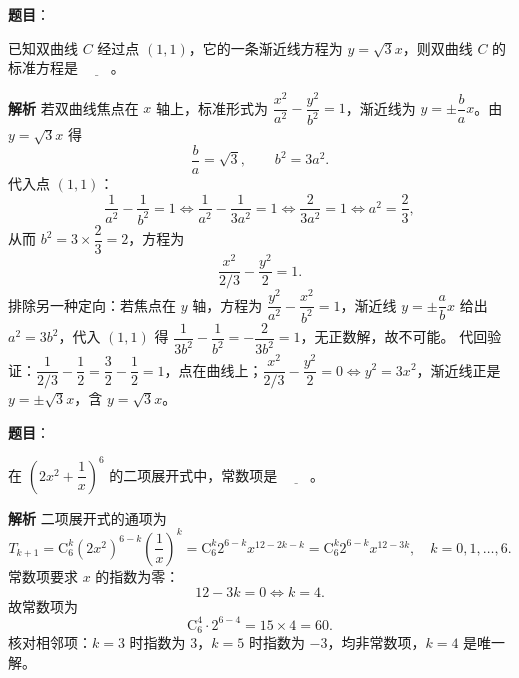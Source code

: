 \begin{answer}

\textbf{题目}：

已知双曲线 $C$ 经过点 $(1,1)$，它的一条渐近线方程为 $y=\sqrt3x$，则双曲线 $C$ 的标准方程是 $\underline{\qquad}$。

\textbf{解析}
若双曲线焦点在 $x$ 轴上，标准形式为 $\dfrac{x^2}{a^2}-\dfrac{y^2}{b^2}=1$，渐近线为 $y=\pm\dfrac ba x$。由 $y=\sqrt3x$ 得
\nopagebreak[4]
\[\frac{b}{a}=\sqrt3,\qquad b^2=3a^2.\]
代入点 $(1,1)$：
\nopagebreak[4]
\[\frac1{a^2}-\frac1{b^2}=1\iff\frac1{a^2}-\frac1{3a^2}=1\iff\frac{2}{3a^2}=1\iff a^2=\frac23,\]
从而 $b^2=3\times\dfrac23=2$，方程为
\nopagebreak[4]
\[\frac{x^2}{2/3}-\frac{y^2}{2}=1.\]
排除另一种定向：若焦点在 $y$ 轴，方程为 $\dfrac{y^2}{a^2}-\dfrac{x^2}{b^2}=1$，渐近线 $y=\pm\dfrac ab x$ 给出 $a^2=3b^2$，代入 $(1,1)$ 得 $\dfrac1{3b^2}-\dfrac1{b^2}=-\dfrac{2}{3b^2}=1$，无正数解，故不可能。
代回验证：$\dfrac{1}{2/3}-\dfrac12=\dfrac32-\dfrac12=1$，点在曲线上；$\dfrac{x^2}{2/3}-\dfrac{y^2}{2}=0\iff y^2=3x^2$，渐近线正是 $y=\pm\sqrt3x$，含 $y=\sqrt3x$。


\end{answer}
\begin{answer}

\textbf{题目}：

在 $\left(2x^2+\dfrac1x\right)^6$ 的二项展开式中，常数项是 $\underline{\qquad}$。

\textbf{解析}
二项展开式的通项为
\nopagebreak[4]
\[T_{k+1}=\mathrm C_6^k\left(2x^2\right)^{6-k}\left(\frac1x\right)^k=\mathrm C_6^k2^{6-k}x^{12-2k-k}=\mathrm C_6^k2^{6-k}x^{12-3k},\quad k=0,1,\dots,6.\]
常数项要求 $x$ 的指数为零：
\nopagebreak[4]
\[12-3k=0\iff k=4.\]
故常数项为
\nopagebreak[4]
\[\mathrm C_6^4\cdot2^{6-4}=15\times4=60.\]
核对相邻项：$k=3$ 时指数为 $3$，$k=5$ 时指数为 $-3$，均非常数项，$k=4$ 是唯一解。


\end{answer}
